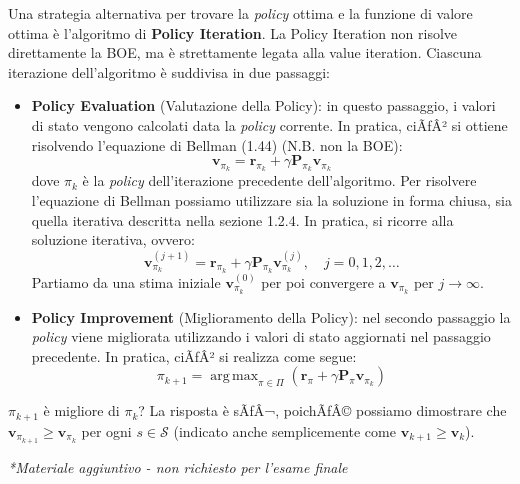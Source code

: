 ﻿\documentclass[11pt, a4paper]{report}
\DeclareMathOperator*{\argmax}{arg\,max}
\begin{document}
Una strategia alternativa per trovare la \emph{policy} ottima e la funzione di valore ottima è l'algoritmo di \textbf{Policy Iteration}. La Policy Iteration non risolve direttamente la BOE, ma è strettamente legata alla value iteration. Ciascuna iterazione dell'algoritmo è suddivisa in due passaggi:
\begin{itemize}
    \item \textbf{Policy Evaluation} (Valutazione della Policy): in questo passaggio, i valori di stato vengono calcolati data la \emph{policy} corrente. In pratica, ciÃƒÂ² si ottiene risolvendo l'equazione di Bellman (1.44) (N.B. non la BOE):
    \begin{equation}
    \bm{v}_{\pi_k} = \bm{r}_{\pi_k} + \gamma \bm{P}_{\pi_k} \bm{v}_{\pi_k}
    \end{equation}
    dove $\pi_k$ è la \emph{policy} dell'iterazione precedente dell'algoritmo. Per risolvere l'equazione di Bellman possiamo utilizzare sia la soluzione in forma chiusa, sia quella iterativa descritta nella sezione 1.2.4. In pratica, si ricorre alla soluzione iterativa, ovvero:
    \begin{equation}
    \bm{v}_{\pi_k}^{(j+1)} = \bm{r}_{\pi_k} + \gamma \bm{P}_{\pi_k} \bm{v}_{\pi_k}^{(j)}, \quad j = 0, 1, 2, \dots
    \end{equation}
    Partiamo da una stima iniziale $\bm{v}_{\pi_k}^{(0)}$ per poi convergere a $\bm{v}_{\pi_k}$ per $j \to \infty$.

    \item \textbf{Policy Improvement} (Miglioramento della Policy): nel secondo passaggio la \emph{policy} viene migliorata utilizzando i valori di stato aggiornati nel passaggio precedente. In pratica, ciÃƒÂ² si realizza come segue:
    \begin{equation}
    \pi_{k+1} = \argmax_{\pi \in \Pi} (\bm{r}_\pi + \gamma \bm{P}_\pi \bm{v}_{\pi_k})
    \end{equation}
\end{itemize}

$\pi_{k+1}$ è migliore di $\pi_k$? La risposta è sÃƒÂ¬, poichÃƒÂ© possiamo dimostrare che $\bm{v}_{\pi_{k+1}} \ge \bm{v}_{\pi_k}$ per ogni $s \in \mathcal{S}$ (indicato anche semplicemente come $\bm{v}_{k+1} \ge \bm{v}_k$).

\newpage

\textit{*Materiale aggiuntivo - non richiesto per l'esame finale}
\end{document}
